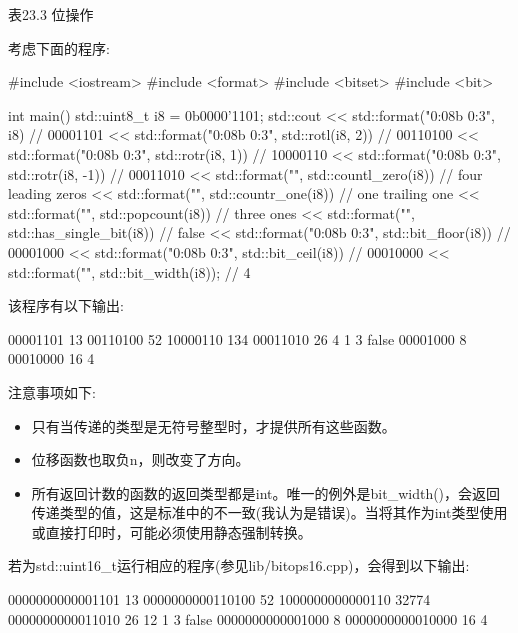 \begin{center}
表23.3 位操作
\end{center}

考虑下面的程序:


\begin{cpp}
#include <iostream>
#include <format>
#include <bitset>
#include <bit>

int main()
{
	std::uint8_t i8 = 0b0000'1101;
	std::cout
		<< std::format("{0:08b} {0:3}\n", i8) // 00001101
		<< std::format("{0:08b} {0:3}\n", std::rotl(i8, 2)) // 00110100
		<< std::format("{0:08b} {0:3}\n", std::rotr(i8, 1)) // 10000110
		<< std::format("{0:08b} {0:3}\n", std::rotr(i8, -1)) // 00011010
		<< std::format("{}\n", std::countl_zero(i8)) // four leading zeros
		<< std::format("{}\n", std::countr_one(i8)) // one trailing one
		<< std::format("{}\n", std::popcount(i8)) // three ones
		<< std::format("{}\n", std::has_single_bit(i8)) // false
		<< std::format("{0:08b} {0:3}\n", std::bit_floor(i8)) // 00001000
		<< std::format("{0:08b} {0:3}\n", std::bit_ceil(i8)) // 00010000
		<< std::format("{}\n", std::bit_width(i8)); // 4
}
\end{cpp}

该程序有以下输出:

\begin{shell}
00001101  13
00110100  52
10000110 134
00011010  26
4
1
3
false
00001000  8
00010000 16
4
\end{shell}

注意事项如下:

\begin{itemize}
\item
只有当传递的类型是无符号整型时，才提供所有这些函数。

\item
位移函数也取负n，则改变了方向。

\item
所有返回计数的函数的返回类型都是int。唯一的例外是bit\_width()，会返回传递类型的值，这是标准中的不一致(我认为是错误)。当将其作为int类型使用或直接打印时，可能必须使用静态强制转换。
\end{itemize}

若为std::uint16\_t运行相应的程序(参见lib/bitops16.cpp)，会得到以下输出:

\begin{shell}
0000000000001101    13
0000000000110100    52
1000000000000110 32774
0000000000011010    26
12
1
3
false
0000000000001000     8
0000000000010000    16
4
\end{shell}

